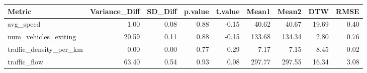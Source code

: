\begin{table}[ht]
\centering
\begin{tabular}{lrrrrrrrr}
  \hline
Metric & Variance\_Diff & SD\_Diff & p.value & t.value & Mean1 & Mean2 & DTW & RMSE \\ 
  \hline
avg\_speed & 1.00 & 0.08 & 0.88 & -0.15 & 40.62 & 40.67 & 19.69 & 0.40 \\ 
  num\_vehicles\_exiting & 20.59 & 0.11 & 0.88 & -0.15 & 133.68 & 134.34 & 2.80 & 0.76 \\ 
  traffic\_density\_per\_km & 0.00 & 0.00 & 0.77 & 0.29 & 7.17 & 7.15 & 8.45 & 0.02 \\ 
  traffic\_flow & 63.40 & 0.54 & 0.93 & 0.08 & 297.77 & 297.55 & 16.34 & 3.08 \\ 
   \hline
\end{tabular}
\end{table}
